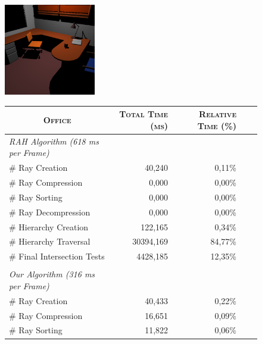 \begin{figure}[!htb]
    \begin{minipage}{0.25\linewidth}
        \centering
        \includegraphics[width=4.0cm]{Images/Office_Preview}
    \end{minipage}
    \begin{minipage}{0.725\linewidth}
        \centering
        \fontsize{8}{10}
        \selectfont
        \begin{tabular}[h]{l|rrrr}
            \multicolumn{1}{c|}{\textsc{Office}} & \textsc{Total Time (ms)} & \textsc{Relative Time (\%)}\\
            \hline
            \emph{RAH Algorithm (618 ms per Frame)} & & \\
            \hline
            \quad \# Ray Creation               & 40,240	& 0,11\%	\\
            \quad \# Ray Compression            & 0,000     & 0,00\%	\\
            \quad \# Ray Sorting                & 0,000	    & 0,00\%    \\
            \quad \# Ray Decompression          & 0,000	    & 0,00\%    \\
            \quad \# Hierarchy Creation         & 122,165	& 0,34\%    \\
            \quad \# Hierarchy Traversal        & 30394,169	& 84,77\%   \\
            \quad \# Final Intersection Tests   & 4428,185	& 12,35\%	\\
            & & \\
            \hline
            \emph{Our Algorithm (316 ms per Frame)} & & \\
            \hline
            \quad \# Ray Creation               & 40,433	& 0,22\%	\\
            \quad \# Ray Compression            & 16,651    & 0,09\%	\\
            \quad \# Ray Sorting                & 11,822	& 0,06\%    \\

\end{tabular}
\end{minipage}
\end{figure}
